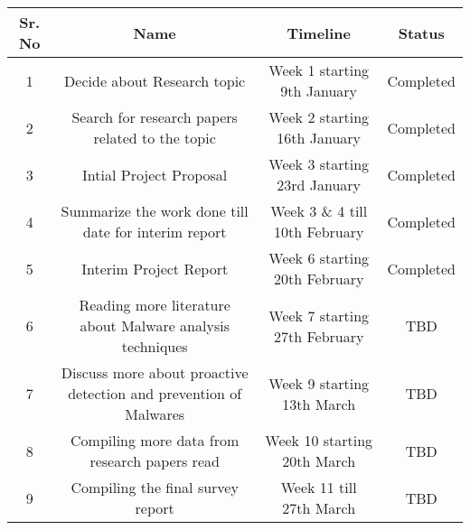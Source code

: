 \documentclass[11pt]{article}
\begin{document}
	\begin{center}
		\begin{tabular}{cccc}
			\hline
			Sr. No & Name & Timeline & Status\\
			\hline
			1 & Decide about Research topic  & Week 1 starting 9th January & Completed\\
			\hline
			2 & Search for research papers related to the topic & Week 2 starting 16th January & Completed\\
			\hline
			3 & Intial Project Proposal & Week 3 starting 23rd January & Completed\\
			\hline
			4 & Summarize the work done till date for interim report & Week 3 \& 4 till 10th February & Completed\\
			\hline
			5 & Interim Project Report  & Week 6 starting 20th February  & Completed\\
			\hline
			6 & Reading more literature about Malware analysis techniques & Week 7 starting 27th February & TBD\\
			\hline
			7 & Discuss more about proactive detection and prevention of Malwares & Week 9 starting 13th March & TBD\\
			\hline
			8 & Compiling more data from research papers read & Week 10 starting 20th March & TBD\\
			\hline
			9 & Compiling the final survey report & Week 11 till 27th March & TBD\\
			\hline
		\end{tabular}\\
	\end{center}


\end{document}
